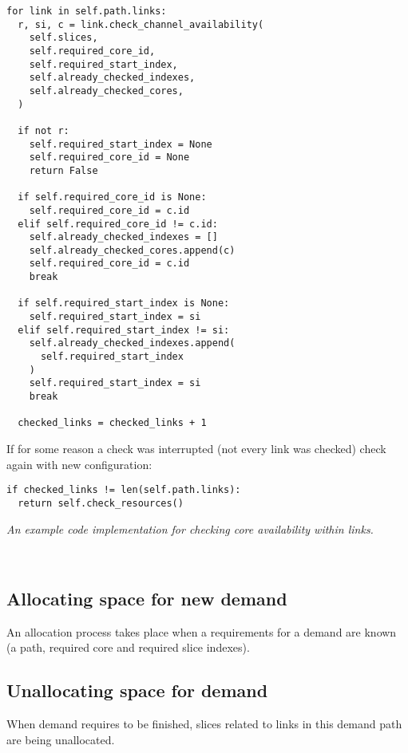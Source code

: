\documentclass[conference]{IEEEtran}
\begin{document}
\begin{small}
\begin{lstlisting}[frame=single]
for link in self.path.links:
  r, si, c = link.check_channel_availability(
    self.slices,
    self.required_core_id,
    self.required_start_index,
    self.already_checked_indexes,
    self.already_checked_cores,
  ) 

  if not r:
    self.required_start_index = None
    self.required_core_id = None
    return False

  if self.required_core_id is None:
    self.required_core_id = c.id
  elif self.required_core_id != c.id:
    self.already_checked_indexes = []
    self.already_checked_cores.append(c)
    self.required_core_id = c.id
    break

  if self.required_start_index is None:
    self.required_start_index = si
  elif self.required_start_index != si:
    self.already_checked_indexes.append(
      self.required_start_index
    )
    self.required_start_index = si
    break
    
  checked_links = checked_links + 1

\end{lstlisting}
\end{small}

If for some reason a check was interrupted (not every link was checked) check again with new configuration:
\begin{small}
\begin{lstlisting}[frame=single]
if checked_links != len(self.path.links):
  return self.check_resources()
\end{lstlisting}
\textit{An example code implementation for checking core availability within links.}
\end{small}
\\

\subsection{Allocating space for new demand}
An allocation process takes place when a requirements for a demand are known (a path, required core and required slice indexes).

\subsection{Unallocating space for demand}
When demand requires to be finished, slices related to links in this demand path are being unallocated.
\end{document}
